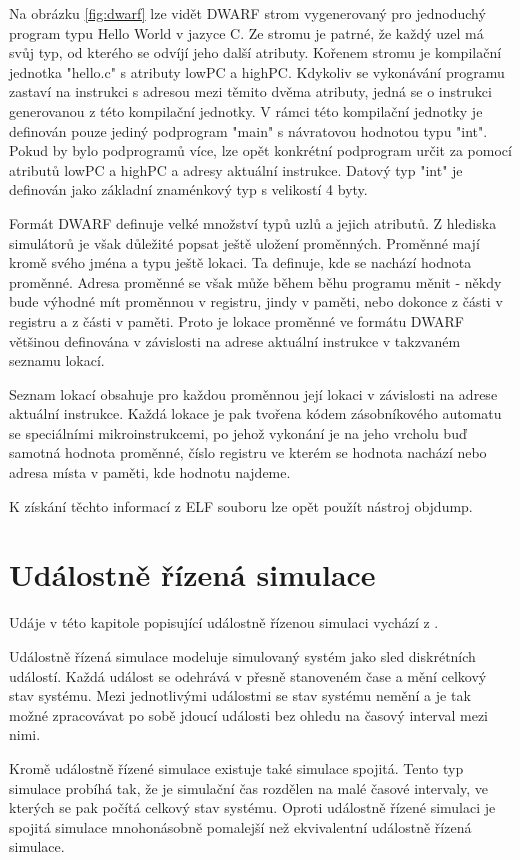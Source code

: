 Na obrázku \ref{fig:dwarf} lze vidět DWARF strom vygenerovaný pro jednoduchý program typu Hello World v jazyce C. Ze stromu je patrné, že každý uzel má svůj typ, od kterého se odvíjí jeho další atributy. Kořenem stromu je kompilační jednotka "hello.c" s atributy lowPC a highPC. Kdykoliv se vykonávání programu zastaví na instrukci s adresou mezi těmito dvěma atributy, jedná se o instrukci generovanou z této kompilační jednotky. V rámci této kompilační jednotky je definován pouze jediný podprogram "main" s návratovou hodnotou typu "int". Pokud by bylo podprogramů více, lze opět konkrétní podprogram určit za pomocí atributů lowPC a highPC a adresy aktuální instrukce. Datový typ "int" je definován jako základní znaménkový typ s velikostí 4 byty.

Formát DWARF definuje velké množství typů uzlů a jejich atributů. Z hlediska simulátorů je však důležité popsat ještě uložení proměnných. Proměnné mají kromě svého jména a typu ještě lokaci. Ta definuje, kde se nachází hodnota proměnné. Adresa proměnné se však může během běhu programu měnit - někdy bude výhodné mít proměnnou v registru, jindy v paměti, nebo dokonce z části v registru a z části v paměti. Proto je lokace proměnné ve formátu DWARF většinou definována v závislosti na adrese aktuální instrukce v takzvaném seznamu lokací.

Seznam lokací obsahuje pro každou proměnnou její lokaci v závislosti na adrese aktuální instrukce. Každá lokace je pak tvořena kódem zásobníkového automatu se speciálními mikroinstrukcemi, po jehož vykonání je na jeho vrcholu buď samotná hodnota proměnné, číslo registru ve kterém se hodnota nachází nebo
adresa místa v paměti, kde hodnotu najdeme.

K získání těchto informací z ELF souboru lze opět použít nástroj objdump.

\chapter{Událostně řízená simulace}

Udáje v této kapitole popisující událostně řízenou simulaci vychází z \cite{nutaro}.

Událostně řízená simulace modeluje simulovaný systém jako sled diskrétních událostí. Každá událost se odehrává v přesně stanoveném čase a mění celkový
stav systému. Mezi jednotlivými událostmi se stav systému nemění a je tak možné zpracovávat po sobě jdoucí události bez ohledu na časový interval
mezi nimi.

Kromě událostně řízené simulace existuje také simulace spojitá. Tento typ simulace probíhá tak, že je simulační čas rozdělen na malé časové intervaly, ve kterých se pak počítá celkový stav systému. Oproti událostně řízené simulaci je spojitá simulace mnohonásobně pomalejší než ekvivalentní událostně řízená simulace.

